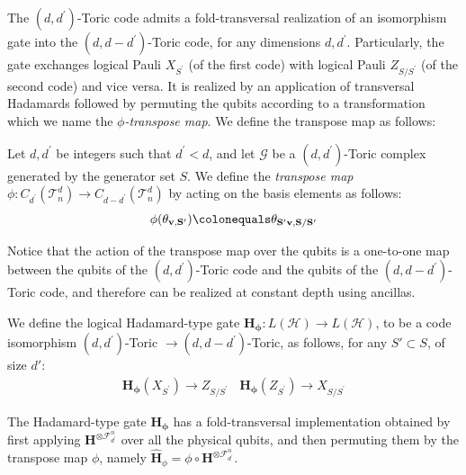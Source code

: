 
The $(d,d^{\prime})$-Toric code admits a fold-transversal realization of an isomorphism gate into the $(d,d-d^{\prime})$-Toric code, for any dimensions $d,d^{\prime}$. Particularly, the gate exchanges logical Pauli $X_{S^{\prime}}$ (of the first code) with logical Pauli $Z_{S/S^{\prime}}$ (of the second code) and vice versa. It is realized by an application of transversal Hadamards followed by permuting the qubits according to a transformation which we name the \textit{$\phi$-transpose map}. We define the transpose map as follows:
\begin{definition}
  \label{def:trans}
  Let $d, d^{\prime}$ be integers such that $d^{\prime} < d$, and let $\mathcal{G}$ be a $(d, d^{\prime})$-Toric complex generated by the generator set $S$.   We define the \textit{transpose map} $\phi : C_{d^{\prime}}(\mathcal{T}_n^d) \rightarrow C_{d - d^{\prime}}(\mathcal{T}_n^d)$ by acting on the basis elements as follows:
  \begin{equation*}
    \begin{split}
      \phi(\rotfv{v}{S^{\prime}}) \colonequals \rotfv{S^{\prime}v}{S/S^{\prime}} 
    \end{split}
  \end{equation*}
\end{definition}
Notice that the action of the transpose map over the qubits is a one-to-one map between the qubits of the $(d,d^{\prime})$-Toric code and the qubits of the $(d,d-d^{\prime})$-Toric code, and therefore can be realized at constant depth using ancillas.
\begin{definition}  
  \label{def:htrans}
We define the logical Hadamard-type gate $ \mathbf{H_{\phi}} \colon L (\mathcal{H}) \rightarrow L (\mathcal{H}) $, to be a code isomorphism $(d,d^{\prime})$-Toric $\rightarrow (d,d-d^{\prime})$-Toric, as follows, for any $ S' \subset S $, of size $ d' $:
  \begin{equation*}
    \begin{split}
      \mathbf{H_{\phi}} ( X_{S^{\prime}} )  \rightarrow Z_{S/S^{\prime}} \ \ \ \  \mathbf{H_{\phi}} ( Z_{S^{\prime}} )   \rightarrow X_{S/S^{\prime}} 
    \end{split}
  \end{equation*}
\end{definition}
\begin{claim}
  The Hadamard-type gate $ \mathbf{H_{\phi}}$ has a fold-transversal implementation obtained by first applying $\mathbf{H}^{\otimes\mathcal{F}_{d^\prime}^{n}}$ over all the physical qubits, and then permuting them by the transpose map $\phi$, namely $\mathbf{\hat{H}}_{\phi} = \phi \circ \mathbf{H}^{\otimes\mathcal{F}_{d^\prime}^{n}}$.
\end{claim}
